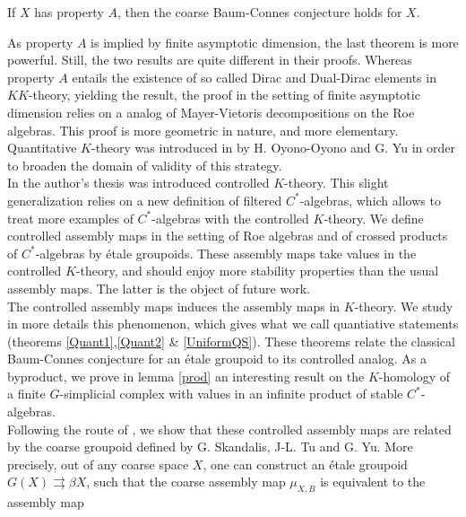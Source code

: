 \begin{thm}[G. Yu \cite{Yu2}]
If $X$ has property $A$, then the coarse Baum-Connes conjecture holds for $X$.
\end{thm}

As property $A$ is implied by finite asymptotic dimension, the last theorem is more powerful. Still, the two results are quite different in their proofs. Whereas property $A$ entails the existence of so called Dirac and Dual-Dirac elements in $KK$-theory, yielding the result, the proof in the setting of finite asymptotic dimension relies on a analog of Mayer-Vietoris decompositions on the Roe algebras. This proof is more geometric in nature, and more elementary. Quantitative $K$-theory was introduced in \cite{OY2} by H. Oyono-Oyono and G. Yu in order to broaden the domain of validity of this strategy.\\ 

In the author's thesis was introduced controlled $K$-theory. This slight generalization relies on a new definition of filtered $C^*$-algebras, which allows to treat more examples of $C^*$-algebras with the controlled $K$-theory. We define controlled assembly maps in the setting of Roe algebras and of crossed products of $C^*$-algebras by étale groupoids. These assembly maps take values in the controlled $K$-theory, and should enjoy more stability properties than the usual assembly maps. The latter is the object of future work. \\

The controlled assembly maps induces the assembly maps in $K$-theory. We study in more details this phenomenon, which gives what we call quantiative statements (theorems \ref{Quant1},\ref{Quant2} \& \ref{UniformQS}). These theorems relate the classical Baum-Connes conjecture for an étale groupoid to its controlled analog. As a byproduct, we prove in lemma \ref{prod} an interesting result on the $K$-homology of a finite $G$-simplicial complex with values in an infinite product of stable $C^*$-algebras.\\

Following the route of \cite{SkTuYu}, we show that these controlled assembly maps are related by the coarse groupoid defined by G. Skandalis, J-L. Tu and G. Yu. More precisely, out of any coarse space $X$, one can construct an étale groupoid $G(X) \rightrightarrows \beta X$, such that the coarse assembly map $\mu_{X,B}$ is equivalent to the assembly map

